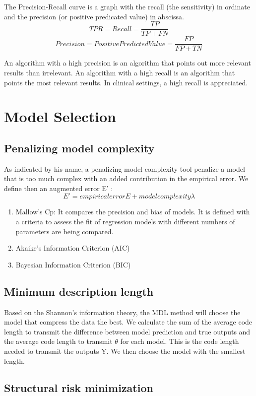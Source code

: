 \documentclass[a4paper,12pt]{article}
\begin{document}
The Precision-Recall curve is a graph with the recall (the sensitivity) in ordinate and the precision (or positive predicated value) in abscissa. 
\[TPR = Recall = \frac{TP}{TP + FN}\]
\[Precision = Positive Predicted Value = \frac{FP}{FP + TN}\]

An algorithm with a high precision is an algorithm that points out more relevant results than irrelevant.  
An algorithm with a high recall is an algorithm that points the most relevant results.
In clinical settings, a high recall is appreciated. 

\vspace{10pt}
\section{Model Selection}
\subsection{Penalizing model complexity}
As indicated by his name, a penalizing model complexity tool  penalize a model that is too much complex with an added contribution in the empirical error. We define then an augmented error E' : 
\[E' = empirical error E + model complexity   \lambda \]
\begin{enumerate}
\item Mallow's Cp:
It compares the precision and bias of models. It is defined with a criteria to assess the fit of regression models with different numbers of parameters are being compared.
\item Akaike's Information Criterion (AIC)
\item Bayesian Information Criterion (BIC)
\end{enumerate}
\subsection{Minimum description length}

Based on the Shannon's information theory, the MDL method will choose the model that compress the data the best.
We calculate the sum of the average code length to transmit the difference between model prediction and true outputs and the average code length to transmit $\theta$ for each model. This is the code length needed to transmit the outputs Y. We then choose the model with the smallest length. 
\subsection{Structural risk minimization}
\end{document}

